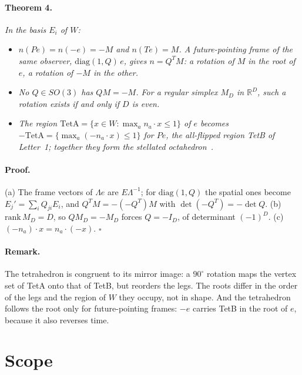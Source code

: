 \documentclass[twocolumn]{iopjournal}
\begin{document}
\paragraph{Theorem 4.} \textit{In the basis $E_i$ of $W$:}
\begin{itemize}
\item[(a)] \textit{$n(Pe) = n(-e) = -M$ and $n(Te) = M$. A
  future-pointing frame of the same observer, $\mathrm{diag}(1, Q)\,e$,
  gives $n = Q^T M$: a rotation of $M$ in the root of $e$, a rotation
  of $-M$ in the other.}
\item[(b)] \textit{No $Q \in SO(3)$ has $QM = -M$. For a regular
  simplex $M_D$ in $\mathbb{R}^D$, such a rotation exists if and only
  if $D$ is even.}
\item[(c)] \textit{The region
  $\mathrm{TetA} = \{x \in W : \max_a n_a \cdot x \le 1\}$ of $e$
  becomes $-\mathrm{TetA} = \{\max_a (-n_a \cdot x) \le 1\}$ for $Pe$,
  the all-flipped region TetB of Letter~1; together they form the
  stellated octahedron~\cite{NelsonForced}.}
\end{itemize}

\paragraph{Proof.} (a) The frame vectors of $\Lambda e$ are
$E\Lambda^{-1}$; for $\mathrm{diag}(1, Q)$ the spatial ones become
$E_j' = \sum_i Q_{ji} E_i$, and $Q^T M = -(-Q^T)M$ with
$\det(-Q^T) = -\det Q$. (b) $\mathrm{rank}\, M_D = D$, so
$QM_D = -M_D$ forces $Q = -I_D$, of determinant $(-1)^D$. (c)
$(-n_a) \cdot x = n_a \cdot (-x)$. \hfill $\square$

\paragraph{Remark.} The tetrahedron is congruent to its mirror image:
a $90^\circ$ rotation maps the vertex set of TetA onto that of TetB,
but reorders the legs. The roots differ in the order of the legs and
the region of $W$ they occupy, not in shape. And the tetrahedron
follows the root only for future-pointing frames: $-e$ carries TetB
in the root of $e$, because it also reverses time.


\section*{Scope}
\end{document}
